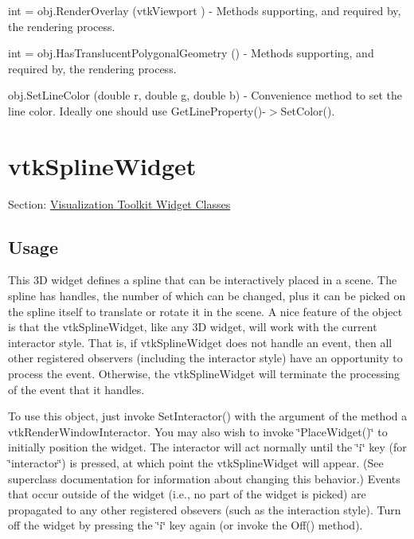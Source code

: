 \begin{DoxyItemize}
\item {\ttfamily int = obj.\-Render\-Overlay (vtk\-Viewport )} -\/ Methods supporting, and required by, the rendering process.  
\item {\ttfamily int = obj.\-Has\-Translucent\-Polygonal\-Geometry ()} -\/ Methods supporting, and required by, the rendering process.  
\item {\ttfamily obj.\-Set\-Line\-Color (double r, double g, double b)} -\/ Convenience method to set the line color. Ideally one should use Get\-Line\-Property()-\/$>$Set\-Color().  
\end{DoxyItemize}\hypertarget{vtkwidgets_vtksplinewidget}{}\section{vtk\-Spline\-Widget}\label{vtkwidgets_vtksplinewidget}
Section\-: \hyperlink{sec_vtkwidgets}{Visualization Toolkit Widget Classes} \hypertarget{vtkwidgets_vtkxyplotwidget_Usage}{}\subsection{Usage}\label{vtkwidgets_vtkxyplotwidget_Usage}
This 3\-D widget defines a spline that can be interactively placed in a scene. The spline has handles, the number of which can be changed, plus it can be picked on the spline itself to translate or rotate it in the scene. A nice feature of the object is that the vtk\-Spline\-Widget, like any 3\-D widget, will work with the current interactor style. That is, if vtk\-Spline\-Widget does not handle an event, then all other registered observers (including the interactor style) have an opportunity to process the event. Otherwise, the vtk\-Spline\-Widget will terminate the processing of the event that it handles.

To use this object, just invoke Set\-Interactor() with the argument of the method a vtk\-Render\-Window\-Interactor. You may also wish to invoke \char`\"{}\-Place\-Widget()\char`\"{} to initially position the widget. The interactor will act normally until the \char`\"{}i\char`\"{} key (for \char`\"{}interactor\char`\"{}) is pressed, at which point the vtk\-Spline\-Widget will appear. (See superclass documentation for information about changing this behavior.) Events that occur outside of the widget (i.\-e., no part of the widget is picked) are propagated to any other registered obsevers (such as the interaction style). Turn off the widget by pressing the \char`\"{}i\char`\"{} key again (or invoke the Off() method).

